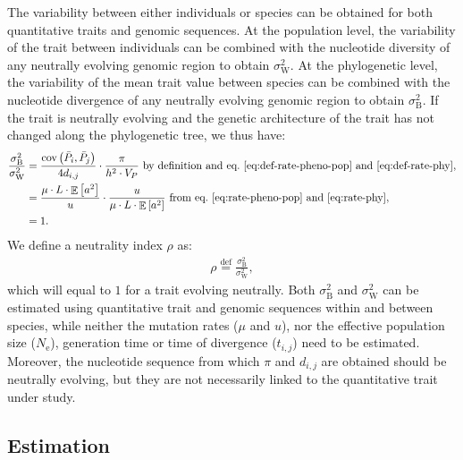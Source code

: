 \documentclass{article}
\newcommand{\defEqual}{\stackrel{\text{def}}{=}}
\newcommand{\Multiply}{\cdot}
\DeclareMathOperator{\E}{\mathbb{E}}
\DeclareMathOperator{\Cov}{\text{cov}}
\newcommand{\Ne}{N_{\text{e}}}
\newcommand{\Spi}{i}
\newcommand{\Spj}{j}
\newcommand{\NbrGen}{t_{\Spi, \Spj}}
\newcommand{\NucDiv}{d_{\Spi, \Spj}}
\newcommand{\Trait}{P}
\newcommand{\Heritability}{h^2}
\newcommand{\MeanTrait}{\bar{\Trait}}
\newcommand{\VarPhy}{\Cov \left( \MeanTrait_{\Spi}, \MeanTrait_{\Spj}\right)}
\newcommand{\MutationRatePheno}{\mu}
\newcommand{\MutationRateNuc}{u}
\newcommand{\NbrLoci}{L}
\newcommand{\VarPhenotype}{V_{\Trait}}
\newcommand{\GenArchi}{\NbrLoci \Multiply \E \left[ a^2 \right]}
\newcommand{\RateBetween}{\sigma^2_{\mathrm{B}}}
\newcommand{\RateWhithin}{\sigma^2_{\mathrm{W}}}
\newcommand{\NI}{\rho}
\begin{document}
The variability between either individuals or species can be obtained for both quantitative traits and genomic sequences.
At the population level, the variability of the trait between individuals can be combined with the nucleotide diversity of any neutrally evolving genomic region to obtain $\RateWhithin$.
At the phylogenetic level, the variability of the mean trait value between species can be combined with the nucleotide divergence of any neutrally evolving genomic region to obtain $\RateBetween$.
If the trait is neutrally evolving and the genetic architecture of the trait has not changed along the phylogenetic tree, we thus have:
\begin{align}
    \frac{\RateBetween}{\RateWhithin} &= \frac{\VarPhy}{4 \NucDiv} \Multiply \frac{\pi}{\Heritability \Multiply \VarPhenotype} \text{ by definition and eq.~\ref{eq:def-rate-pheno-pop} and~\ref{eq:def-rate-phy}},\\
    &= \frac{\MutationRatePheno \Multiply \GenArchi}{\MutationRateNuc} \Multiply \frac{\MutationRateNuc}{\MutationRatePheno \Multiply \GenArchi} \text{ from eq.~\ref{eq:rate-pheno-pop} and~\ref{eq:rate-phy}}, \\
    &= 1.
\end{align}
We define a neutrality index $\NI$ as:
\begin{align}
\NI \defEqual \frac{\RateBetween}{\RateWhithin},
\end{align}
 which will equal to $1$ for a trait evolving neutrally.
Both $\RateBetween$ and $\RateWhithin$ can be estimated using quantitative trait and genomic sequences within and between species, while neither the mutation rates ($\MutationRatePheno$ and $\MutationRateNuc$), nor the effective population size ($\Ne$), generation time or time of divergence ($\NbrGen$) need to be estimated.
Moreover, the nucleotide sequence from which $\pi$ and $\NucDiv$ are obtained should be neutrally evolving, but they are not necessarily linked to the quantitative trait under study.

\subsection*{Estimation}\label{subsec:estimate}
\end{document}
